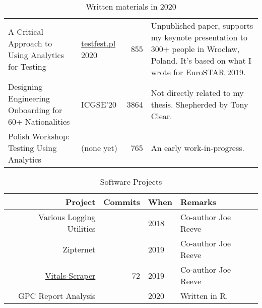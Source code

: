 \begin{table}[htpb]
\begin{tabular}{p{4.3cm}|p{1.9cm}|r|p{4.7cm}}
     A Critical Approach to Using Analytics for Testing &\href{http://testfest.pl/}{testfest.pl} 2020 &855 &Unpublished paper, supports my keynote presentation to 300+ people in Wroclaw, Poland. It's based on what I wrote for EuroSTAR 2019.\\
     
     Designing Engineering Onboarding for 60+ Nationalities &ICGSE'20 &3864 &Not directly related to my thesis. Shepherded by Tony Clear. \\
     
     Polish Workshop: Testing Using Analytics &(none yet) &765 &An early work-in-progress.\\

    \end{tabular}
    \caption{Written materials in 2020}
    \label{tab:written_materials_in_2020}
\end{table}

\begin{table}[htpb]
    \centering
    \footnotesize
    \begin{tabular}{r|r|l|l}
    Project &Commits  &When &Remarks\\
     \hline
     Various Logging Utilities&  &2018 &Co-author Joe Reeve \\
     Zipternet &  &2019  &Co-author Joe Reeve \\
    \href{https://github.com/commercetest/vitals-scraper/}{Vitals-Scraper} &72 &2019 &Co-author Joe Reeve \\
    GPC Report Analysis & &2020 &Written in R. \\
    
    \end{tabular}
    \caption{Software Projects}
    \label{tab:software}
\end{table}
